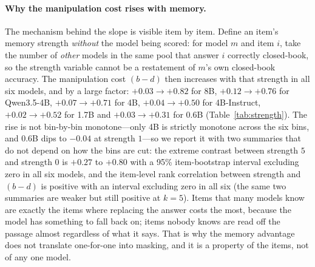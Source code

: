 \documentclass[11pt]{article}
\begin{document}
\paragraph{Why the manipulation cost rises with memory.} The mechanism behind the slope is
visible item by item. Define an item's memory strength \emph{without} the model being scored:
for model $m$ and item $i$, take the number of \emph{other} models in the same pool that
answer $i$ correctly closed-book, so the strength variable cannot be a restatement of $m$'s own
closed-book accuracy. The manipulation cost $(b-d)$ then increases with that
strength in all six models, and by a large factor: $+0.03 \to +0.82$ for 8B,
$+0.12 \to +0.76$ for Qwen3.5-4B, $+0.07 \to +0.71$ for 4B, $+0.04 \to +0.50$ for
4B-Instruct, $+0.02 \to +0.52$ for 1.7B and $+0.03 \to +0.31$ for 0.6B
(Table~\ref{tab:strength}). The rise is not bin-by-bin monotone---only 4B is strictly
monotone across the six bins, and 0.6B dips to $-0.04$ at strength $1$---so we report it with
two summaries that do not depend on how the bins are cut: the extreme contrast between
strength $5$ and strength $0$ is $+0.27$ to $+0.80$ with a 95\% item-bootstrap interval
excluding zero in all six models, and the item-level rank correlation between strength and
$(b-d)$ is positive with an interval excluding zero in all six (the same two summaries are
weaker but still positive at $k{=}5$). Items that many models know are exactly the items where replacing
the answer costs the most, because the model has something to fall back on; items nobody knows
are read off the passage almost regardless of what it says. That is why the memory advantage
does not translate one-for-one into masking, and it is a property of the items, not of any one
model.
\end{document}
